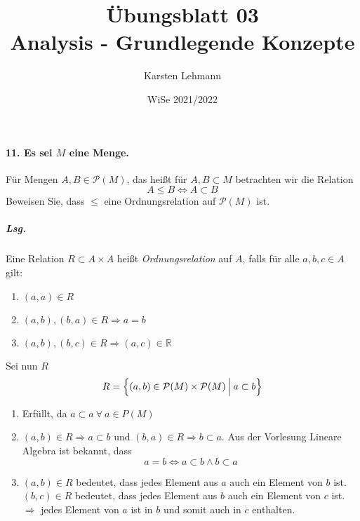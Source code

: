\documentclass{scrreprt}
\author{Karsten Lehmann}
\date{WiSe 2021/2022}
\title{Übungsblatt 03\\Analysis - Grundlegende Konzepte}
\begin{document}
\paragraph{11. Es sei $M$ eine Menge.}
Für Mengen $A, B \in \mathcal{P}(M)$, das heißt für $A, B \subset M$ betrachten
wir die Relation
\[
  A \leq B \iff A \subset B
\]
Beweisen Sie, dass $\leq$ eine Ordnungsrelation auf $\mathcal{P}(M)$ ist.

\subparagraph{Lsg.} Eine Relation $R \subset A \times A$ heißt
\emph{Ordnungsrelation} auf $A$, falls für alle $a, b, c \in A$ gilt:
\begin{enumerate}[1)]
\item $(a, a) \in R$
\item $(a, b), (b, a) \in R \Rightarrow a = b$
\item $(a, b), (b, c) \in R \Rightarrow (a, c) \in \mathbb{R}$
\end{enumerate}

Sei nun $R$
\[
  R = \qty\Big{(a, b) \in \mathcal{P}(M) \times \mathcal{P}(M) \: {\Big |} \: a \subset b}
\]
\begin{enumerate}[1)]
\item Erfüllt, da $a \subset a \: \forall \: a \in P(M)$
\item $(a, b) \in R \Rightarrow a \subset b$ und
  $(b, a) \in R \Rightarrow b \subset a$.
  Aus der Vorlesung Lineare Algebra ist bekannt, dass
  \[
    a = b \iff a \subset b \land b \subset a
  \]
\item $(a, b) \in R$ bedeutet, dass jedes Element aus $a$ auch ein Element von
  $b$ ist.
  $(b, c) \in R$ bedeutet, dass jedes Element aus $b$ auch ein Element von $c$
  ist.
  $\Rightarrow$ jedes Element von $a$ ist in $b$ und somit auch in $c$ enthalten.
\end{enumerate}
\end{document}
